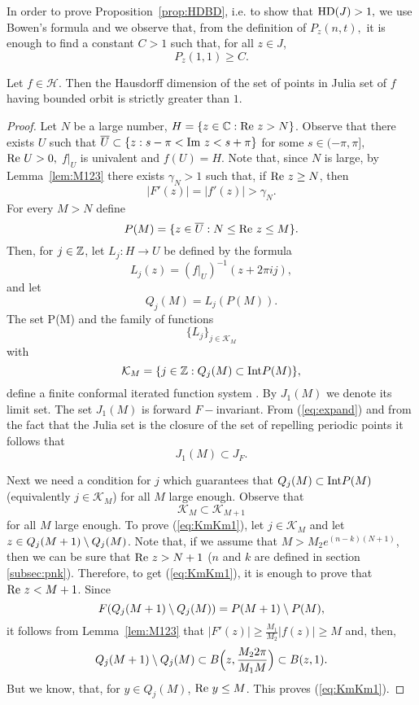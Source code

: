 In order to prove Proposition~\ref{prop:HDBD}, i.e. to show that ${\mathrm{HD}}(J)
>1,$ we use Bowen's formula and we observe that, from the definition of
$P_z(n,t),$ it is enough to find a constant $C>1$ such that, for all $z\in
J$,
\begin{equation}
  \label{eq:P_t}
  P_z(1,1)\geq C.
\end{equation}

\begin{proposition}\label{prop:HDBD}
  Let $f \in \mathcal{H}$. Then the Hausdorff dimension of the set of points
  in Julia set of $f$ having bounded orbit is strictly greater than $1$.
\end{proposition}

\begin{proof}
  Let $N$ be a large number, $H =\{z\in{\mathbb C}: \textrm{Re } z>N\}$. Observe that there
  exists $U$ such that $\overline{U}\subset \{z: s-\pi <\textrm{Im } z < s+{\pi} \}$
  for some $s\in(-\pi,\pi],$ $\textrm{Re } U>0,$ $f|_U$ is univalent and $f(U)=H$.
  Note that, since $N$ is large, by Lemma~\ref{lem:M123} there exists
  $\gamma_N>1$ such that, if $\textrm{Re } z\geq N$, then
  \begin{equation}
    \label{eq:expand}
    |F'(z)|=|f'(z)|>\gamma_N.
  \end{equation}
  For every $M>N$ define
  \[
  P(M) =\{z\in \overline{U}:N\leq\textrm{Re } z\leq M\}.
  \]
  Then, for $j\in{\mathbb Z}$, let $L_j:H\rightarrow U$ be defined by the
  formula
  \[
  L_j(z)=(f|_U)^{-1}(z+2\pi i j),
  \]
  and let
  \begin{equation}\label{subs:J1}
  Q_j(M)=L_j(P(M)).
  \end{equation}
  The set P(M) and the family of functions
  \[
  \{L_j\}_{j\in \mathcal{K}_M}
  \]
  with
  \[
  \mathcal{K}_M=\{j\in{\mathbb Z}:Q_j(M)\subset \text{{\rm Int}} P(M)\},
  \]
  define a finite conformal iterated function system .  By $J_1(M)$ we
  denote its limit set.  The set $J_1(M)$ is forward $F-$invariant.  From
  (\ref{eq:expand}) and from the fact that the Julia set is the closure of
  the set of repelling periodic points it follows that
  \begin{equation} \label{eq:J1NJFa}
  J_1(M)\subset J_{F}.
  \end{equation}
  
  Next we need a condition for $j$ which guarantees that $Q_j(M)\subset\text{{\rm Int}}
  P(M)$ (equivalently $j\in \mathcal{K}_M$) for all $M$ large
  enough. Observe that
  \begin{equation} \label{eq:KmKm1}
  \mathcal{K}_{M}\subset\mathcal{K}_{M+1}
  \end{equation}
  for all $M$ large enough.  To prove (\ref{eq:KmKm1}), let $j\in
  \mathcal{K}_M$ and let $z\in Q_j(M+1)\setminus Q_j(M)$. Note that, if we assume
  that $M>M_2e^{(n-k)(N+1)}$, then we can be sure that $\textrm{Re } z > N+1$ ($n$
  and $k$ are defined in section \ref{subsec:pnk}).  Therefore, to get
  (\ref{eq:KmKm1}), it is enough to prove that $\textrm{Re } z < M+1$.  Since
  \[
  F(Q_j(M+1)\setminus Q_j(M))=P(M+1)\setminus P(M),
  \]
  it follows from Lemma~\ref{lem:M123} that
  $|F'(z)|\geq\frac{M_1}{M_2}|f(z)|\geq M$ and, then,
  \[
  Q_j(M+1)\setminus Q_j(M)\subset B\Big(z,\frac{M_2 2\pi}{M_1 M}\Big)\subset
  B(z,1).
  \]
  But we know, that, for $y\in Q_j(M)$, $\textrm{Re } y \leq M$. This proves
  (\ref{eq:KmKm1}).
  

\end{proof}
